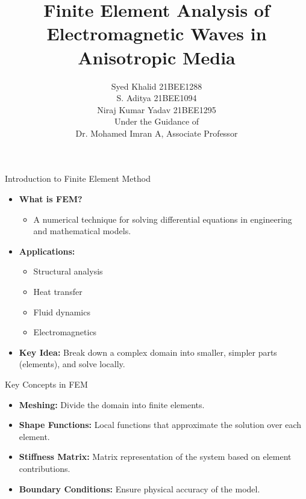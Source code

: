 \documentclass{beamer}
\title{Finite Element Analysis of Electromagnetic Waves in Anisotropic Media}
\author{
    Syed Khalid 21BEE1288 \\
    S. Aditya  21BEE1094 \\
    Niraj Kumar Yadav  21BEE1295 \\
    Under the Guidance of \\ Dr. Mohamed Imran A, Associate Professor 
  }
\institute{
    Course Code: EEE497J  \\
    School: SELECT \\
    VIT Chenna
}
\date{}
\begin{document}
\begin{frame}
  \titlepage
\end{frame}
\begin{frame}{Introduction to Finite Element Method}
    \begin{itemize}
        \item \textbf{What is FEM?}
        \begin{itemize}
            \item A numerical technique for solving differential equations in engineering and mathematical models.
        \end{itemize}
        \item \textbf{Applications:}
        \begin{itemize}
            \item Structural analysis
            \item Heat transfer
            \item Fluid dynamics
            \item Electromagnetics
        \end{itemize}
        \item \textbf{Key Idea:} Break down a complex domain into smaller, simpler parts (elements), and solve locally.
    \end{itemize}
\end{frame}


\begin{frame}{Key Concepts in FEM}
    \begin{itemize}
        \item \textbf{Meshing:} Divide the domain into finite elements.
        \item \textbf{Shape Functions:} Local functions that approximate the solution over each element.
        \item \textbf{Stiffness Matrix:} Matrix representation of the system based on element contributions.
        \item \textbf{Boundary Conditions:} Ensure physical accuracy of the model.
    \end{itemize}
\end{frame}
\end{document}
